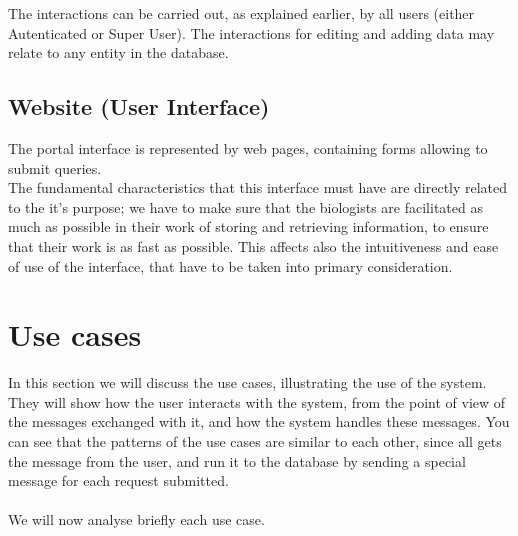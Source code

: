 The interactions can be carried out, as explained earlier, by all users (either Autenticated or Super User). The interactions for editing and adding data may relate to any entity in the database.

\subsection{Website (User Interface)}
The portal interface is represented by web pages, containing forms allowing to submit queries.
\\The fundamental characteristics that this interface must have are directly related to the it's purpose; we have to make sure that the biologists are facilitated as much as possible in their work of storing and retrieving information, to ensure that their work is as fast as possible. This affects also the intuitiveness and ease of use of the interface, that have to be taken into primary consideration.

\section{Use cases}
In this section we will discuss the use cases, illustrating the use of the system.
\\They will show how the user interacts with the system, from the point of view of the messages exchanged with it, and how the system handles these messages. You can see that the patterns of the use cases are similar to each other, since all gets the message from the user, and run it to the database by sending a special message for each request submitted.
\\
\\We will now analyse briefly each use case.
